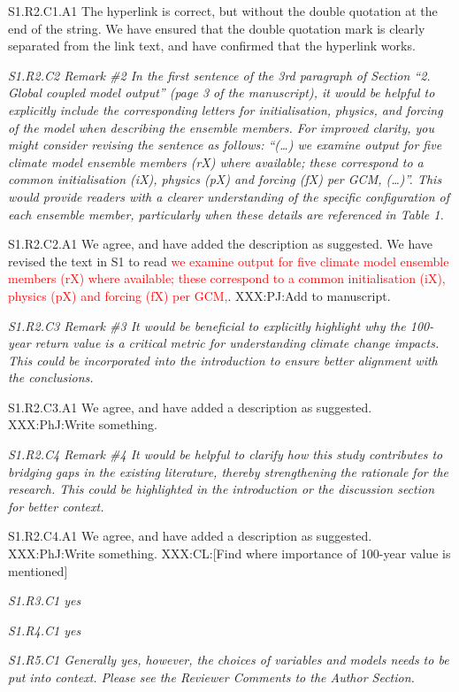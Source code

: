 \documentclass[a4paper,10pt]{article}
\newcommand{\ed}[1]{\textcolor{red}{#1}}
\begin{document}
	S1.R2.C1.A1 The hyperlink is correct, but without the double quotation at the end of the string. We have ensured that the double quotation mark is clearly separated from the link text, and have confirmed that the hyperlink works.
		
	\emph{S1.R2.C2 Remark \#2 In the first sentence of the 3rd paragraph of Section “2. Global coupled model output” (page 3 of the manuscript), it would be helpful to explicitly include the corresponding letters for initialisation, physics, and forcing of the model when describing the ensemble members. For improved clarity, you might consider revising the sentence as follows: “(…) we examine output for five climate model ensemble members (rX) where available; these correspond to a common initialisation (iX), physics (pX) and forcing (fX) per GCM, (…)”. This would provide readers with a clearer understanding of the specific configuration of each ensemble member, particularly when these details are referenced in Table 1.}
	
	S1.R2.C2.A1 We agree, and have added the description as suggested. We have revised the text in S1 to read \ed{we examine output for five climate model ensemble members (rX) where available; these correspond to a common initialisation (iX), physics (pX) and forcing (fX) per GCM,}. XXX:PJ:Add to manuscript.
	
	\emph{S1.R2.C3 Remark \#3 It would be beneficial to explicitly highlight why the 100-year return value is a critical metric for understanding climate change impacts. This could be incorporated into the introduction to ensure better alignment with the conclusions.}
	
	S1.R2.C3.A1 We agree, and have added a description as suggested. XXX:PhJ:Write something.

	\emph{S1.R2.C4 Remark \#4 It would be helpful to clarify how this study contributes to bridging gaps in the existing literature, thereby strengthening the rationale for the research. This could be highlighted in the introduction or the discussion section for better context.}
	
	S1.R2.C4.A1 We agree, and have added a description as suggested. XXX:PhJ:Write something. XXX:CL:[Find where importance of 100-year value is mentioned]

	\emph{S1.R3.C1 yes}

	\emph{S1.R4.C1 yes}

	\emph{S1.R5.C1 Generally yes, however, the choices of variables and models needs to be put into context. Please see the Reviewer Comments to the Author Section.}
	
\end{document}
